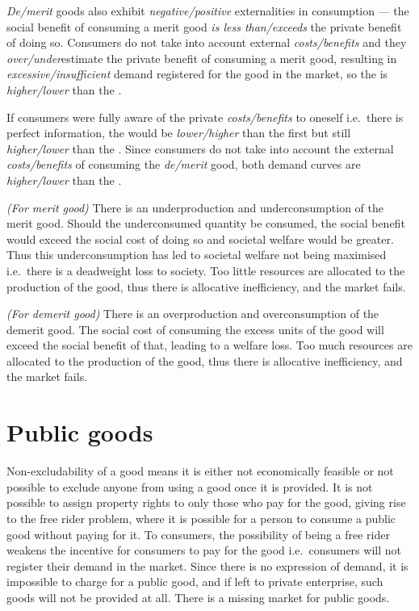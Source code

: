 \documentclass[Economics.tex]{subfiles}
\begin{document}
\emph{De\slash{}merit} goods also exhibit \emph{negative\slash{}positive} externalities in consumption --- the social benefit of consuming a merit good \emph{is less than\slash{}exceeds} the private benefit of doing so. Consumers do not take into account external \emph{costs\slash{}benefits} and they \emph{over\slash{}under}estimate the private benefit of consuming a merit good, resulting in \emph{excessive\slash{}insufficient} demand registered for the good in the market, so the  is \emph{higher\slash{}lower} than the .

If consumers were fully aware of the private \emph{costs\slash{}benefits} to oneself i.e.\ there is perfect information, the  would be \emph{lower\slash{}higher} than the first  but still \emph{higher\slash{}lower} than the . Since consumers do not take into account the external \emph{costs\slash{}benefits} of consuming the \emph{de\slash{}merit} good, both demand curves are \emph{higher\slash{}lower} than the .

\emph{(For merit good)} There is an underproduction and underconsumption of the merit good. Should the underconsumed quantity be consumed, the social benefit would exceed the social cost of doing so and societal welfare would be greater. Thus this underconsumption has led to societal welfare not being maximised i.e.\ there is a deadweight loss to society. Too little resources are allocated to the production of the good, thus there is allocative inefficiency, and the market fails.

\emph{(For demerit good)} There is an overproduction and overconsumption of the demerit good. The social cost of consuming the excess units of the good will exceed the social benefit of that, leading to a welfare loss. Too much resources are allocated to the production of the good, thus there is allocative inefficiency, and the market fails.
\section{Public goods}
Non-excludability of a good means it is either not economically feasible or not possible to exclude anyone from using a good once it is provided. It is not possible to assign property rights to only those who pay for the good, giving rise to the free rider problem, where it is possible for a person to consume a public good without paying for it. To consumers, the possibility of being a free rider weakens the incentive for consumers to pay for the good i.e.\ consumers will not register their demand in the market. Since there is no expression of demand, it is impossible to charge for a public good, and if left to private enterprise, such goods will not be provided at all. There is a missing market for public goods.
\end{document}
